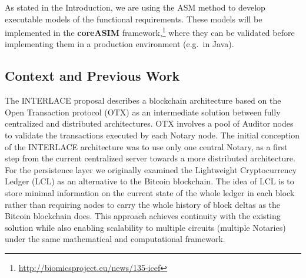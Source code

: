 As stated in the Introduction, we are using the ASM method  \cite{BoergerStaerk2003} to develop executable models of the functional requirements. These models will be implemented in the \textbf{coreASIM} framework,\footnote{\url{http://biomicsproject.eu/news/135-icef}} where they can be validated before implementing them in a production environment (e.g.\ in Java).

\subsection{Context and Previous Work}
The INTERLACE proposal describes a blockchain architecture based on the Open Transaction protocol (OTX) \cite{Odom} as an intermediate solution between fully centralized and distributed architectures. OTX involves a pool of Auditor nodes to validate the transactions executed by each Notary node. The initial conception of the INTERLACE architecture was to use only one central Notary, as a first step from the current centralized server towards a more distributed architecture. For the persistence layer we originally examined the Lightweight Cryptocurrency Ledger (LCL) \cite{White2015} as an alternative to the Bitcoin blockchain. The idea of LCL is to store minimal information on the current state of the whole ledger in each block rather than requiring nodes to carry the whole history of block deltas as the Bitcoin blockchain does. This approach achieves continuity with the existing solution while also enabling scalability to multiple circuits (multiple Notaries) under the same mathematical and computational framework.

